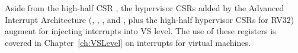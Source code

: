 Aside from the high-half CSR , the hypervisor CSRs added
by the Advanced Interrupt Architecture (, ,
, and , plus the high-half hypervisor CSRs for
RV32) augment  for injecting interrupts into VS level.
The use of these registers is covered in Chapter~\ref{ch:VSLevel} on
interrupts for virtual machines.

